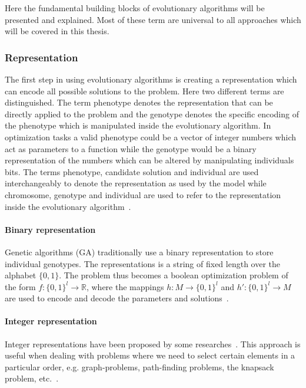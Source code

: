 Here the fundamental building blocks of evolutionary algorithms will be presented and explained. Most of these term are universal to all approaches which will be covered in this thesis.

\subsubsection{Representation}

The first step in using evolutionary algorithms is creating a representation which can encode all possible solutions to the problem. Here two different terms are distinguished. The term phenotype denotes the representation that can be directly applied to the problem and the genotype denotes the specific encoding of the phenotype which is manipulated inside the evolutionary algorithm. In optimization tasks a valid phenotype could be a vector of integer numbers which act as parameters to a function while the genotype would be a binary representation of the numbers which can be altered by manipulating individuals bits. The terms phenotype, candidate solution and individual are used interchangeably to denote the representation as used by the model while chromosome, genotype and individual are used to refer to the representation inside the evolutionary algorithm~\cite{Eiben2015_whatevolutionary}.

\paragraph{Binary representation}

Genetic algorithms (GA) traditionally use a binary representation to store individual genotypes. The representations is a string of fixed length over the alphabet $\{0,1\}$. The problem thus becomes a boolean optimization problem of the form $ f:\{0,1\}^l \rightarrow \mathbb{R}$, where the mappings $h:M \rightarrow \{0,1\}^l$ and $h':\{0,1\}^l \rightarrow M$ are used to encode and decode the parameters and solutions~\cite{back1997evolutionary}.

\paragraph{Integer representation}

Integer representations have been proposed by some researches~\cite{unter611evolutionary}. This approach is useful when dealing with problems where we need to select certain elements in a particular order, e.g. graph-problems, path-finding problems, the knapsack problem, etc.~\cite{Eiben201511}.



